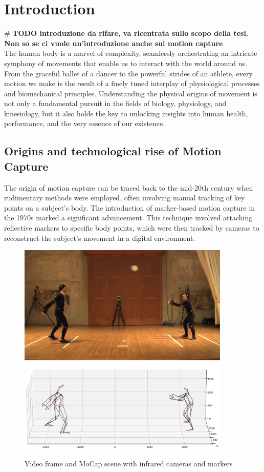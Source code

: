 \section{Introduction}
\# \textbf{TODO introduzione da rifare, va ricentrata sullo scopo della tesi. Non so se ci vuole un'introduzione anche sul motion capture}
\\The human body is a marvel of complexity, 
seamlessly orchestrating an intricate symphony of movements 
that enable us to interact with the world around us. 
From the graceful ballet of a dancer to the powerful strides of an athlete, 
every motion we make is the result of a finely tuned interplay of physiological processes 
and biomechanical principles. 
Understanding the physical origins of movement is not only a fundamental pursuit 
in the fields of biology, physiology, and kinesiology, 
but it also holds the key to unlocking insights into human health, performance, and 
the very essence of our existence.

\subsection{Origins and technological rise of Motion Capture}
The origin of motion capture can be traced back to the mid-20th century when rudimentary methods were employed, 
often involving manual tracking of key points on a subject's body. 
The introduction of marker-based motion capture in the 1970s marked a significant advancement. 
This technique involved attaching reflective markers to specific body points, 
which were then tracked by cameras to reconstruct the subject's movement in a digital environment. 
\begin{figure}[H]
    \centering
    \includegraphics[width=0.9\textwidth]{graphics/bodyMarkersExampleImage.png}
    \includegraphics[width=0.9\textwidth]{graphics/bodyMarkersExampleMoCap.png}
    \caption{Video frame and MoCap scene with infrared cameras and markers}
    \label{fig:common}
\end{figure}

